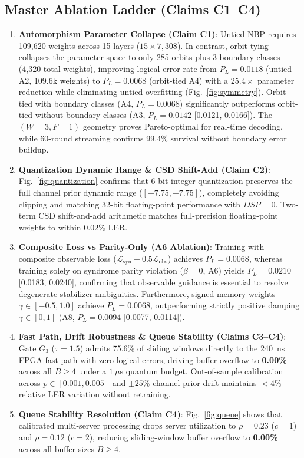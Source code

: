 \documentclass[journal]{IEEEtran}
\begin{document}
\subsection{Master Ablation Ladder (Claims C1--C4)}
\begin{enumerate}
    \item \textbf{Automorphism Parameter Collapse (Claim C1)}: Untied NBP requires 109,620 weights across 15 layers ($15 \times 7,308$). In contrast, orbit tying collapses the parameter space to only 285 orbits plus 3 boundary classes (4,320 total weights), improving logical error rate from $P_L = 0.0118$ (untied A2, 109.6k weights) to $P_L = 0.0068$ (orbit-tied A4) with a $25.4\times$ parameter reduction while eliminating untied overfitting (Fig.~\ref{fig:symmetry}). Orbit-tied with boundary classes (A4, $P_L = 0.0068$) significantly outperforms orbit-tied without boundary classes (A3, $P_L = 0.0142$ [0.0121, 0.0166]). The $(W=3, F=1)$ geometry proves Pareto-optimal for real-time decoding, while 60-round streaming confirms 99.4\% survival without boundary error buildup.
    \item \textbf{Quantization Dynamic Range \& CSD Shift-Add (Claim C2)}: Fig.~\ref{fig:quantization} confirms that 6-bit integer quantization preserves the full channel prior dynamic range ($[-7.75, +7.75]$), completely avoiding clipping and matching 32-bit floating-point performance with $DSP=0$. Two-term CSD shift-and-add arithmetic matches full-precision floating-point weights to within $0.02\%$ LER.
    \item \textbf{Composite Loss vs Parity-Only (A6 Ablation)}: Training with composite observable loss ($\mathcal{L}_{\text{syn}} + 0.5\mathcal{L}_{\text{obs}}$) achieves $P_L = 0.0068$, whereas training solely on syndrome parity violation ($\beta = 0$, A6) yields $P_L = 0.0210$ [0.0183, 0.0240], confirming that observable guidance is essential to resolve degenerate stabilizer ambiguities. Furthermore, signed memory weights $\gamma \in [-0.5, 1.0]$ achieve $P_L = 0.0068$, outperforming strictly positive damping $\gamma \in [0, 1]$ (A8, $P_L = 0.0094$ [0.0077, 0.0114]).
    \item \textbf{Fast Path, Drift Robustness \& Queue Stability (Claims C3--C4)}: Gate $G_3$ ($\tau=1.5$) admits 75.6\% of sliding windows directly to the 240~ns FPGA fast path with zero logical errors, driving buffer overflow to \textbf{0.00\%} across all $B \ge 4$ under a $1~\mu\text{s}$ quantum budget. Out-of-sample calibration across $p \in [0.001, 0.005]$ and $\pm 25\%$ channel-prior drift maintains $< 4\%$ relative LER variation without retraining.
    \item \textbf{Queue Stability Resolution (Claim C4)}: Fig.~\ref{fig:queue} shows that calibrated multi-server processing drops server utilization to $\rho = 0.23$ ($c=1$) and $\rho=0.12$ ($c=2$), reducing sliding-window buffer overflow to \textbf{0.00\%} across all buffer sizes $B \ge 4$.
\end{enumerate}
\end{document}
